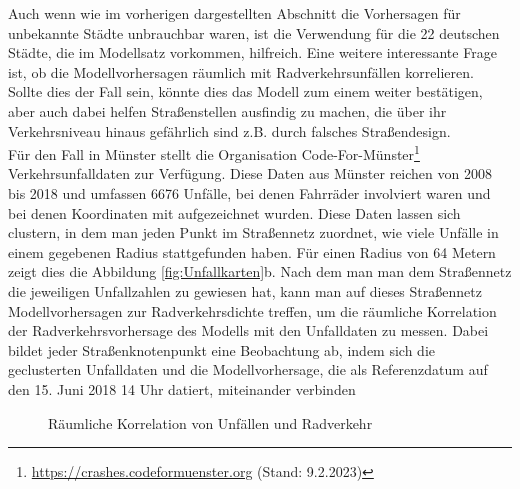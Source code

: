 \documentclass[a4paper,12pt]{thesis}
\begin{document}
Auch wenn wie im vorherigen dargestellten Abschnitt die Vorhersagen für unbekannte Städte unbrauchbar waren, ist die Verwendung für die 22 deutschen Städte, die im Modellsatz vorkommen, hilfreich. Eine weitere interessante Frage ist, ob die Modellvorhersagen räumlich mit Radverkehrsunfällen korrelieren. Sollte dies der Fall sein, könnte dies das Modell zum einem weiter bestätigen, aber auch dabei helfen Straßenstellen ausfindig zu machen, die über ihr Verkehrsniveau hinaus gefährlich sind z.B. durch falsches Straßendesign.\\
Für den Fall in Münster stellt die Organisation Code-For-Münster\footnote{\url{https://crashes.codeformuenster.org} (Stand: 9.2.2023)} Verkehrsunfalldaten zur Verfügung. Diese Daten aus Münster reichen von 2008 bis 2018 und umfassen 6676 Unfälle, bei denen Fahrräder involviert waren und bei denen Koordinaten mit aufgezeichnet wurden. Diese Daten lassen sich clustern, in dem man jeden Punkt im Straßennetz zuordnet, wie viele Unfälle in einem gegebenen Radius stattgefunden haben. Für einen Radius von 64 Metern zeigt dies die Abbildung \ref{fig:Unfallkarten}b. Nach dem man man dem Straßennetz die jeweiligen Unfallzahlen zu gewiesen hat, kann man auf dieses Straßennetz Modellvorhersagen zur Radverkehrsdichte treffen, um die räumliche Korrelation der Radverkehrsvorhersage des Modells mit den Unfalldaten zu messen. Dabei bildet jeder Straßenknotenpunkt eine Beobachtung ab, indem sich die geclusterten Unfalldaten und die Modellvorhersage, die als Referenzdatum auf den 15. Juni 2018 14 Uhr datiert, miteinander verbinden\\

\begin{figure}%
	\centering
	\qquad
	\caption{Räumliche Korrelation von Unfällen und Radverkehr}%
	\label{fig:UnfallKorrelatoon}%
\end{figure}
\end{document}
